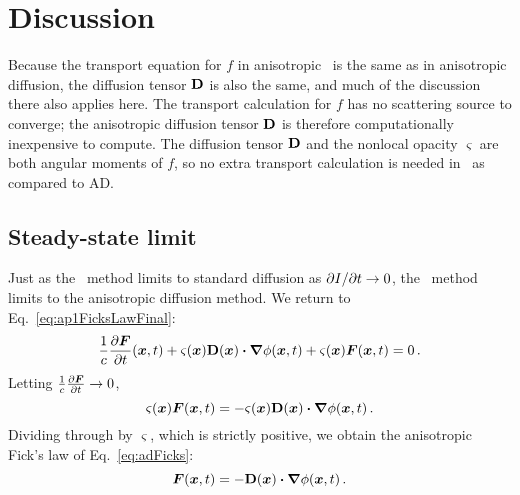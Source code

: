 \section{Discussion}

Because the transport equation for $f$ in anisotropic \Pone\ is the same as in
anisotropic diffusion, the diffusion tensor $\mathbf{D}$ is also the same, and much
of the discussion there also applies here.
The transport calculation for $f$ has no scattering source to converge; the
anisotropic diffusion tensor $\mathbf{D}$ is therefore computationally inexpensive
to compute. The diffusion tensor $\mathbf{D}$ and the nonlocal opacity $\varsigma$
are both angular moments of $f$, so no extra transport calculation is needed in
\APone\ as compared to AD.

\subsection{Steady-state limit}
Just as the \Pone\ method limits to standard diffusion as ${\partial I}/{\partial t} \to 0$,
the \APone\ method limits to the anisotropic diffusion method. We return to
Eq.~\eqref{eq:ap1FicksLawFinal}:
\begin{equation*}
  \frac{1}{c}\frac{\partial \bm{F}}{\partial t}(\bm{x},t)
  + \varsigma(\bm{x}) \mathbf{D}(\bm{x}) \bm{\cdot} \bm{\nabla} \phi(\bm{x}, t)
  + \varsigma(\bm{x})\bm{F}(\bm{x},t)
  = 0 \,.
\end{equation*}
Letting $\frac{1}{c}\frac{\partial \bm{F}}{\partial t}\to 0$,
\begin{equation*}
  \varsigma(\bm{x})\bm{F}(\bm{x},t)
  = -\varsigma(\bm{x}) \mathbf{D}(\bm{x}) \bm{\cdot} \bm{\nabla} \phi(\bm{x}, t) \,.
\end{equation*}
Dividing through by $\varsigma$, which is strictly positive, we obtain the
anisotropic Fick's law of Eq.~\eqref{eq:adFicks}:
\begin{equation*}
 \bm{F}(\bm{x},t)
  = -\mathbf{D}(\bm{x}) \bm{\cdot} \bm{\nabla} \phi(\bm{x}, t) \,. 
\end{equation*}

